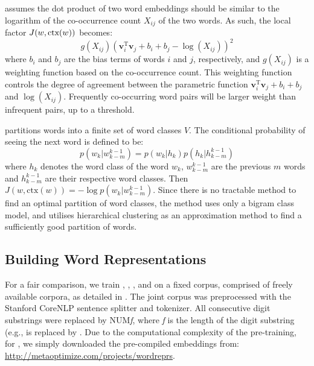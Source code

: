 \Glove assumes the dot product of two word embeddings should be similar
to the logarithm of the co-occurrence count $X_{ij}$ of the two
words. As such, the local factor $J(w, \text{ctx}(w))$ becomes:
\begin{displaymath}
g(X_{ij}) (\mathbf{v}_i^{\text{T}} \mathbf{v}_j + b_i + b_j - \log(X_{ij}))^2
\end{displaymath}
where $b_i$ and $b_j$ are the bias terms of words $i$ and $j$,
respectively, and $g(X_{ij})$ is a weighting function based on the
co-occurrence count. This weighting function controls the degree of
agreement between the parametric function $\mathbf{v}_i^{\text{T}}
\mathbf{v}_j + b_i + b_j $ and $\log(X_{ij})$. Frequently co-occurring
word pairs will be larger weight
than infrequent
pairs, up to a threshold.

\brown partitions words into a finite set of word classes $V$. The
conditional probability of seeing the next word is defined to be:
\begin{displaymath}
p(w_k | w_{k - m}^{k -1}) = p(w_k | h_k) p(h_k | h_{k - m}^{k -1})
\end{displaymath}
where $h_k$ denotes the word class of the word $w_k$, $w_{k - m}^{k -1}$
are the previous $m$ words and $h_{k - m}^{k -1}$ are their respective
word classes. Then $J(w, \text{ctx}(w)) = - \log p(w_k | w_{k - m}^{k
  -1}) $. Since there is no tractable method to find an optimal
partition of word classes, the method uses only a bigram class model, and utilises hierarchical clustering as an approximation method to find a sufficiently good partition of words. 



\subsection{Building Word Representations}
\label{buildingWordRep}

For a fair comparison, we train \brown, \CBOW, \Skipgram, and \Glove on
a fixed corpus, comprised of freely available corpora, as detailed in
. The joint corpus was preprocessed with the
Stanford CoreNLP sentence splitter and tokenizer. All consecutive digit
substrings were replaced by NUM\textit{f}, where \textit{f} is the
length of the digit substring (e.g.,  is replaced by
. Due to the computational complexity of the
pre-training, for \CW, we simply downloaded the pre-compiled embeddings from:
\url{http://metaoptimize.com/projects/wordreprs}.

